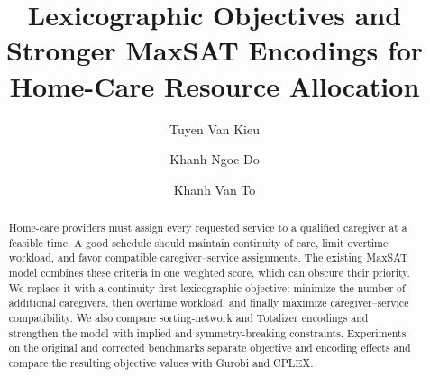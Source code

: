 \documentclass[sigconf,nonacm]{acmart}
\newif\ifinternaloutline
\newif\iffrozenresults
\newcommand{\outlineblock}[1]{%
  \ifinternaloutline
    \par
    {\small\color{blue}\noindent\textbf{Outline note.} #1\par}
  \fi
}
\begin{document}
\title[Lexicographic MaxSAT for Home-Care Allocation]{%
  Lexicographic Objectives and Stronger MaxSAT Encodings for
  Home-Care Resource Allocation}

\author{Tuyen Van Kieu}

\author{Khanh Ngoc Do}

\author{Khanh Van To}
\renewcommand{\shortauthors}{Kieu et al.}

\begin{abstract}
Home-care providers must assign every requested service to a qualified
caregiver at a feasible time.  A good schedule should maintain continuity of
care, limit overtime workload, and favor compatible caregiver--service
assignments.  The existing MaxSAT model combines these criteria in one weighted
score, which can obscure their priority.  We replace it with a continuity-first
lexicographic objective: minimize the number of additional caregivers, then
overtime workload, and finally maximize caregiver--service compatibility.  We
also compare sorting-network and Totalizer encodings and strengthen the model
with implied and symmetry-breaking constraints.  Experiments on the original
and corrected benchmarks separate objective and encoding effects and compare
the resulting objective values with Gurobi and CPLEX.
\iffrozenresults
  
\else
  \outlineblock{Insert two or three quantitative findings generated from the
  frozen tables: verified OPTIMUM counts, a paired objective change, and
  cross-framework objective agreement.  Do not use legacy or pilot values.}
\fi
\end{abstract}


\maketitle
\end{document}

